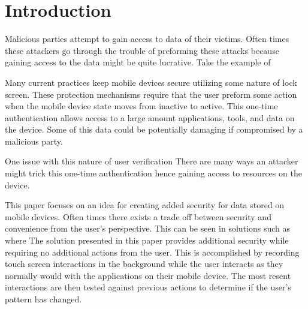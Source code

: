 \section{Introduction}
Malicious parties attempt to gain access to data of their victims. 
Often times these attackers go through the trouble of
preforming these attacks because
gaining access to the data might be quite lucrative.
Take the example of 



Many current practices keep mobile devices secure
utilizing some nature of lock screen.
These protection mechanisms require
that the user preform some action 
when the mobile device state moves from inactive to active.
This one-time authentication allows access to a large amount 
applications, tools, and data on the device.
Some of this data could be potentially
damaging if compromised by a malicious party.

One issue with this nature of user verification %
There are many ways an attacker might trick
this one-time authentication 
hence gaining access to resources on the device.

This paper focuses on an idea for creating
added security for data stored on mobile devices.
Often times there exists a trade off between
security and convenience from the user's perspective.
This can be seen in solutions such as
where
The solution presented in this paper
provides additional security while requiring
no additional actions from the user.
This is accomplished by
recording touch screen interactions
in the background while the
user interacts as they normally would
with the applications on their mobile device.
The most resent interactions are then
tested against previous actions
to determine if the user's
pattern has changed.

